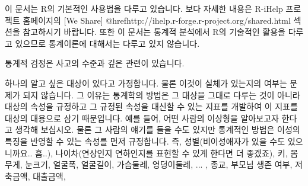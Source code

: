 \documentclass{article}
\begin{document}
이 문서는 R의 기본적인 사용법을 다루고 있습니다. 보다 자세한 내용은 R-iHelp 프로젝트 홈페이지의 [We Share] @href{http://ihelp.r-forge.r-project.org/shared.html} 섹션을 참고하시기 바랍니다.
또한 이 문서는 통계적 분석에서 R의 기술적인 활용을 다루고 있으므로 통계이론에 대해서는 다루고 있지 않습니다.

통계적 검정은 사고의 수준과 깊은 관련이 있습니다.

하나의 알고 싶은 대상이 있다고 가정합니다. 물론 이것이 실체가 있는지의 여부는 문제가 되지 않습니다. 그 이유는 통계학의 방법은 그 대상을 그대로 다루는 것이 아니라 대상의 속성을 규정하고 그 규정된 속성을 대신할 수 있는 지표를 개발하여 이 지표를 대상의 대용으로 삼기 때문입니다. 예를 들어, 어떤 사람의 이상형을 알아보고자 한다고 생각해 보십시오. 물론 그 사람의 얘기를 들을 수도 있지만 통계적인 방법은 이성의 특징을 반영할 수 있는 속성를 먼저 규정합니다. 즉, 성별(비이성애자가 있을 수도 있으니까요.. 흠..), 나이차(연상인지 연하인지를 표현할 수 있게 한다면 더 좋겠죠), 키, 몸무게, 눈크기, 얼굴폭, 얼굴길이, 가슴둘레, 엉덩이둘레, ... , 종교, 부모님 생존 여부, 저축금액, 대출금액, 





\end{document}
